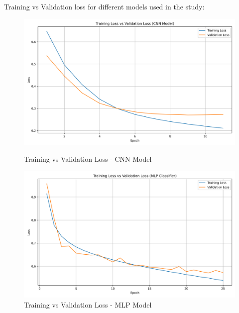 \documentclass{article}
\begin{document}
Training vs Validation loss for different models used in the study:
\begin{figure}[H]
  \centering
  \begin{minipage}[b]{0.45\textwidth}
    \centering
    \includegraphics[width=0.9\linewidth]{cnn_loss_curve.png}
    \caption{Training vs Validation Loss - CNN Model}
    \label{fig:image1}
  \end{minipage}
  \hfill
  \begin{minipage}[b]{0.45\textwidth}
    \centering
    \includegraphics[width=0.9\linewidth]{mlp_loss_curve.png}
    \caption{Training vs Validation Loss - MLP Model}
    \label{fig:image2}
  \end{minipage}
\end{figure}
\end{document}
